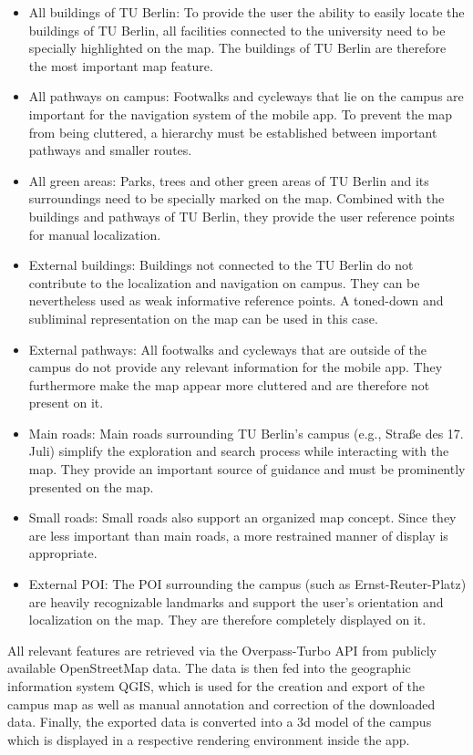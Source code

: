 \begin{itemize}
    \item All buildings of TU Berlin: To provide the user the ability to easily locate the buildings of TU Berlin, all facilities connected to the university need to be specially highlighted on the map. The buildings of TU Berlin are therefore the most important map feature.
    \item All pathways on campus: Footwalks and cycleways that lie on the campus are important for the navigation system of the mobile app. To prevent the map from being cluttered, a hierarchy must be established between important pathways and smaller routes.
    \item All green areas: Parks, trees and other green areas of TU Berlin and its surroundings need to be specially marked on the map. Combined with the buildings and pathways of TU Berlin, they provide the user reference points for manual localization.
    \item External buildings: Buildings not connected to the TU Berlin do not contribute to the localization and navigation on campus. They can be nevertheless used as weak informative reference points. A toned-down and subliminal representation on the map can be used in this case.
    \item External pathways: All footwalks and cycleways that are outside of the campus do not provide any relevant information for the mobile app. They furthermore make the map appear more cluttered and are therefore not present on it.
    \item Main roads: Main roads surrounding TU Berlin's campus (e.g., Straße des 17. Juli) simplify the exploration and search process while interacting with the map. They provide an important source of guidance and must be prominently presented on the map.
    \item Small roads: Small roads also support an organized map concept. Since they are less important than main roads, a more restrained manner of display is appropriate.
    \item External POI: The POI surrounding the campus (such as Ernst-Reuter-Platz) are heavily recognizable landmarks and support the user's orientation and localization on the map. They are therefore completely displayed on it.
\end{itemize}

All relevant features are retrieved via the Overpass-Turbo API from publicly available OpenStreetMap data. The data is then fed into the geographic information system QGIS, which is used for the creation and export of the campus map as well as manual annotation and correction of the downloaded data. Finally, the exported data is converted into a 3d model of the campus which is displayed in a respective rendering environment inside the app.


